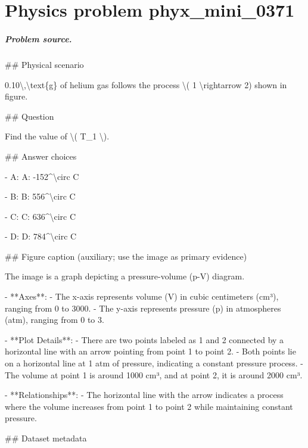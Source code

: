 
\chapter{Physics problem phyx\_mini\_0371}
\label{ch:PhyXMiniProblems_problem_phyx_mini_0371}

\paragraph{Problem source.}
\#\# Physical scenario

0.10\textbackslash{},\textbackslash{}text\{g\} of helium gas follows the process \textbackslash{}( 1 \textbackslash{}rightarrow 2) shown in figure.

\#\# Question

Find the value of \textbackslash{}( T\_1 \textbackslash{}).

\#\# Answer choices

- A: A: -152\textasciicircum{}\textbackslash{}circ C

- B: B: 556\textasciicircum{}\textbackslash{}circ C

- C: C: 636\textasciicircum{}\textbackslash{}circ C

- D: D: 784\textasciicircum{}\textbackslash{}circ C

\#\# Figure caption (auxiliary; use the image as primary evidence)

The image is a graph depicting a pressure-volume (p-V) diagram.

- **Axes**: 
  - The x-axis represents volume (V) in cubic centimeters (cm³), ranging from 0 to 3000.
  - The y-axis represents pressure (p) in atmospheres (atm), ranging from 0 to 3.

- **Plot Details**:
  - There are two points labeled as 1 and 2 connected by a horizontal line with an arrow pointing from point 1 to point 2.
  - Both points lie on a horizontal line at 1 atm of pressure, indicating a constant pressure process.
  - The volume at point 1 is around 1000 cm³, and at point 2, it is around 2000 cm³.

- **Relationships**:
  - The horizontal line with the arrow indicates a process where the volume increases from point 1 to point 2 while maintaining constant pressure.

\#\# Dataset metadata

